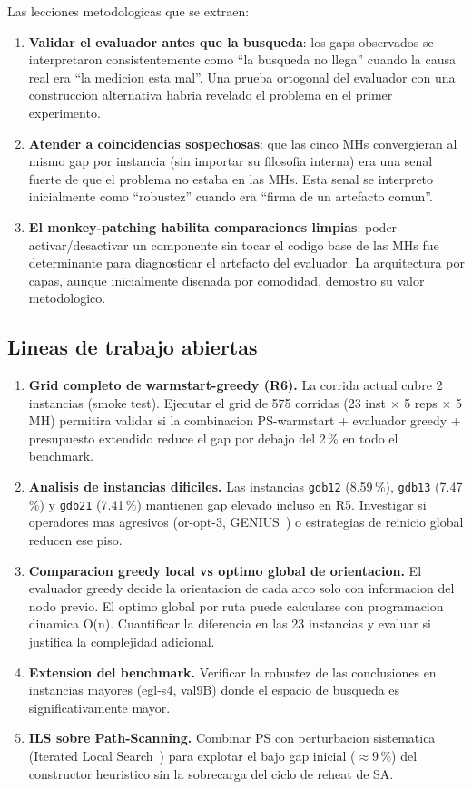 Las lecciones metodologicas que se extraen:

\begin{enumerate}
\item \textbf{Validar el evaluador antes que la busqueda}: los gaps
  observados se interpretaron consistentemente como ``la busqueda no
  llega'' cuando la causa real era ``la medicion esta mal''. Una
  prueba ortogonal del evaluador con una construccion alternativa
  habria revelado el problema en el primer experimento.
\item \textbf{Atender a coincidencias sospechosas}: que las cinco
  MHs convergieran al mismo gap por instancia (sin importar su
  filosofia interna) era una senal fuerte de que el problema no
  estaba en las MHs. Esta senal se interpreto inicialmente como
  ``robustez'' cuando era ``firma de un artefacto comun''.
\item \textbf{El monkey-patching habilita comparaciones limpias}:
  poder activar/desactivar un componente sin tocar el codigo base de
  las MHs fue determinante para diagnosticar el artefacto del
  evaluador. La arquitectura por capas, aunque inicialmente disenada
  por comodidad, demostro su valor metodologico.
\end{enumerate}

\subsection{Lineas de trabajo abiertas}

\begin{enumerate}
\item \textbf{Grid completo de warmstart-greedy (R6).} La corrida
  actual cubre 2 instancias (smoke test). Ejecutar el grid de
  575 corridas (23 inst $\times$ 5 reps $\times$ 5 MH) permitira
  validar si la combinacion PS-warmstart + evaluador greedy + presupuesto
  extendido reduce el gap por debajo del 2\,\% en todo el benchmark.
\item \textbf{Analisis de instancias dificiles.} Las instancias
  \texttt{gdb12} (8.59\,\%), \texttt{gdb13} (7.47\,\%) y
  \texttt{gdb21} (7.41\,\%) mantienen gap elevado incluso en R5.
  Investigar si operadores mas agresivos (or-opt-3, GENIUS~\cite{gendreau1992}) o
  estrategias de reinicio global reducen ese piso.
\item \textbf{Comparacion greedy local vs optimo global de orientacion.}
  El evaluador greedy decide la orientacion de cada arco solo con
  informacion del nodo previo. El optimo global por ruta puede
  calcularse con programacion dinamica O(n). Cuantificar la diferencia
  en las 23 instancias y evaluar si justifica la complejidad adicional.
\item \textbf{Extension del benchmark.} Verificar la robustez de las
  conclusiones en instancias mayores (egl-s4, val9B) donde el espacio
  de busqueda es significativamente mayor.
\item \textbf{ILS sobre Path-Scanning.} Combinar PS con perturbacion
  sistematica (Iterated Local Search~\cite{lourenco2003}) para explotar el bajo gap inicial
  ($\approx 9$\,\%) del constructor heuristico sin la sobrecarga del
  ciclo de reheat de SA.
\end{enumerate}

